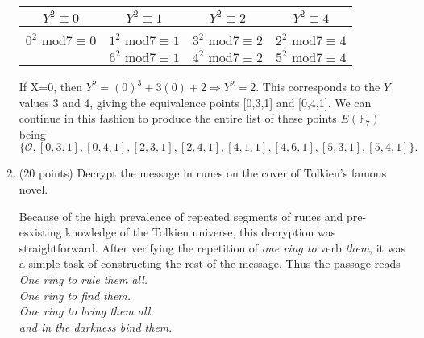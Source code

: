 \documentclass[12pt]{article}
\begin{document}
\begin{enumerate}
\begin{center}
\begin{tabular}{c|c|c|c}
$Y^2\equiv0$ & $Y^2\equiv1$ & $Y^2\equiv2$ & $Y^2\equiv4$\\
\hline
&&&\\
$0^2\text{ mod}7 \equiv 0$ &$1^2\text{ mod}7 \equiv 1$ &$3^2\text{ mod}7 \equiv 2$ &$2^2\text{ mod}7 \equiv 4$ \\
&$6^2\text{ mod}7 \equiv 1$ &$4^2\text{ mod}7 \equiv 2$ &$5^2\text{ mod}7 \equiv 4$\\
\end{tabular}
\end{center}


If X=0, then $Y^2=(0)^3+3(0)+2 \Rightarrow Y^2=2$. This corresponds to the $Y$ values 3 and 4, giving the equivalence points [0,3,1] and [0,4,1]. We can continue in this fashion to produce the entire list of these points $E(\mathbb{F}_7)$ being
\[\{\mathcal{O}, [0,3,1],[0,4,1],[2,3,1],[2,4,1],[4,1,1],[4,6,1],[5,3,1],[5,4,1]\}.\]


\item (20 points)
Decrypt the message in runes on the cover of Tolkien's famous novel.

Because of the high prevalence of repeated segments of runes and pre-esxisting knowledge of the Tolkien universe, this decryption was straightforward. After verifying the repetition of \textit{one ring to} verb \textit{them}, it was a simple task of constructing the rest of the message. Thus the passage reads \\

\textit{One ring to rule them all. \\One ring to find them. \\One ring to bring them all \\and in the darkness bind them}.



\end{enumerate}
\end{document}
